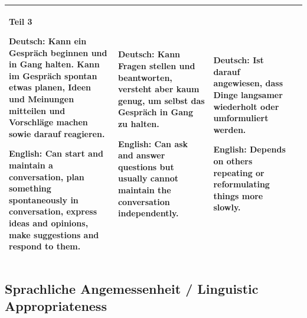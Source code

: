 \documentclass[a4paper]{article}
\begin{document}
\begin{table}[H]
\begin{tabular}{|p{3cm}|p{4cm}|p{4cm}|p{4cm}|}
                    Teil 3
                    
                    \textbf{Deutsch:} Kann ein Gespräch beginnen und in Gang halten. Kann im Gespräch spontan etwas planen, Ideen und Meinungen mitteilen und Vorschläge machen sowie darauf reagieren.
                    
                    \textbf{English:} Can start and maintain a conversation, plan something spontaneously in conversation, express ideas and opinions, make suggestions and respond to them.
                    &
                    \textbf{Deutsch:} Kann Fragen stellen und beantworten, versteht aber kaum genug, um selbst das Gespräch in Gang zu halten.
                    
                    \textbf{English:} Can ask and answer questions but usually cannot maintain the conversation independently.
                    &
                    \textbf{Deutsch:} Ist darauf angewiesen, dass Dinge langsamer wiederholt oder umformuliert werden.
                    
                    \textbf{English:} Depends on others repeating or reformulating things more slowly.
                    \\
                    \hline
                \end{tabular}
            \end{table}
            
            
            \newpage
        
        \subsection{Sprachliche Angemessenheit / Linguistic Appropriateness}
            
\end{document}
